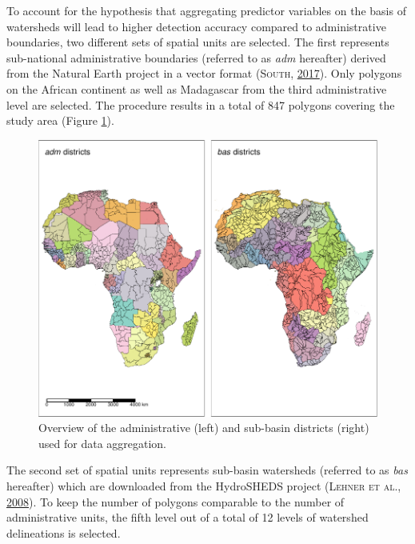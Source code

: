 \documentclass[a4paper,11pt]{article}
\begin{document}
To account for the hypothesis that aggregating predictor variables on the basis
of watersheds will lead to higher detection accuracy compared to administrative
boundaries, two different sets of spatial units are selected.
The first represents sub-national administrative boundaries (referred to as \emph{adm} hereafter)
derived from the Natural Earth project in a vector format \textsc{(\textnormal{\textsc{South}}, \textnormal{\protect\hyperlink{ref-south2017}{2017}})}.
Only polygons on the African continent as well as Madagascar from the third
administrative level are selected. The procedure results in a total of 847 polygons
covering the study area (Figure \ref{fig:02-data-units-map}).
\begin{figure}[H]

{\centering \includegraphics{thesis_files/figure-latex/02-data-units-map-1} 

}

\caption[Overview of the administrative and sub-basin districts used for data aggregation.]{Overview of the administrative (left) and sub-basin districts (right) used for data aggregation.}\label{fig:02-data-units-map}
\end{figure}
The second set of spatial units represents sub-basin watersheds (referred to as \emph{bas} hereafter)
which are downloaded from the HydroSHEDS project \textsc{(\textnormal{\textsc{Lehner} \textsc{et al.}}, \textnormal{\protect\hyperlink{ref-lehner2008}{2008}})}. To keep the
number of polygons comparable to the number of administrative units, the fifth
level out of a total of 12 levels of watershed delineations is selected.
\end{document}
